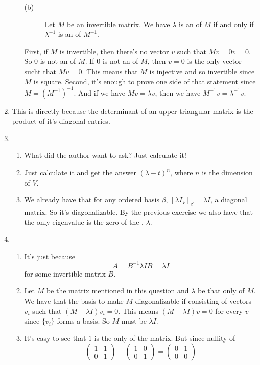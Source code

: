 \begin{enumerate}
\begin{enumerate}
\begin{description}
\item[(b)] Let $M$ be an invertible matrix. We have $\lambda $ is an \egva{} of $M$ if and only if $\lambda^{-1}$ is an \egva{} of $M^{-1}$.
\end{description}
First, if $M$ is invertible, then there's no vector $v$ such that $Mv=0v=0$. So $0$ is not an \egva{} of $M$. If $0$ is not an \egva{} of $M$, then $v=0$ is the only vector sucht that $Mv=0$. This means that $M$ is injective and so invertible since $M$ is square. Second, it's enough to prove one side of that statement since $M=(M^{-1})^{-1}$. And if we have $Mv=\lambda v$, then we have $M^{-1}v=\lambda^{-1}v$.
\end{enumerate}
\item This is directly because the determinant of an upper triangular matrix is the product of it's diagonal entries.
\item \begin{enumerate}
\item What did the author want to ask? Just calculate it!
\item Just calculate it and get the answer $(\lambda -t)^n$, where $n$ is the dimension of $V$.
\item We already have that for any ordered basis $\beta $, $[\lambda I_V]_{\beta}=\lambda I$, a diagonal matrix. So it's diagonalizable. By the previous exercise we also have that the only eigenvalue is the zero of the \charpoly{}, $\lambda$.
\end{enumerate}
\item \begin{enumerate}
\item It's just because 
\[A=B^{-1}\lambda I B=\lambda I\]
for some invertible matrix $B$.
\item Let $M$ be the matrix mentioned in this question and $\lambda $ be that only \egva{} of $M$. We have that the basis to make $M$ diagonalizable if consisting of vectors $v_i$ such that $(M-\lambda I)v_i=0$. This means $(M-\lambda I)v=0$ for every $v$ since $\{v_i\}$ forms a basis. So $M$ must be $\lambda I$.
\item It's easy to see that $1$ is the only \egva{} of the matrix. But since nullity of 
\[\begin{pmatrix}1&1\\0&1\end{pmatrix}-\begin{pmatrix}1&0\\0&1\end{pmatrix}=\begin{pmatrix}0&1\\0&0\end{pmatrix}\]

\end{enumerate}
\end{enumerate}
